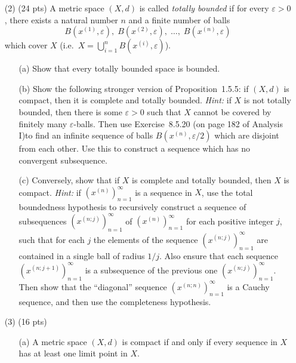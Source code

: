 \documentclass[12pt]{amsart}
\theoremstyle{definition}
\theoremstyle{remark}
\begin{document}
\begin{CJK}{UTF8}{bkai}
\begin{enumerate}
\begin{enumerate}
 
  \end{enumerate}






\bigskip


\item[(2)]  (24 pts) 
A metric space $(X,d)$ is called \emph{totally bounded} if for every $\varepsilon > 0$, there exists a natural number $n$ and a finite number of balls
\[
B(x^{(1)},\varepsilon), \; B(x^{(2)},\varepsilon), \; \dots, \; B(x^{(n)},\varepsilon)
\]
which cover $X$ (i.e.\ $X = \bigcup_{i=1}^n B(x^{(i)},\varepsilon)$).

\begin{enumerate}
\item[(a)] Show that every totally bounded space is bounded.

\item[(b)] Show the following stronger version of Proposition~1.5.5: if $(X,d)$ is compact, then it is complete and totally bounded.  
\emph{Hint:} if $X$ is not totally bounded, then there is some $\varepsilon > 0$ such that $X$ cannot be covered by finitely many $\varepsilon$-balls.  
Then use Exercise~8.5.20  (on page 182 of Analysis I)to find an infinite sequence of balls $B(x^{(n)},\varepsilon/2)$ which are disjoint from each other. Use this to construct a sequence which has no convergent subsequence.

\item[(c)] Conversely, show that if $X$ is complete and totally bounded, then $X$ is compact.  
\emph{Hint:} if $(x^{(n)})_{n=1}^\infty$ is a sequence in $X$, use the total boundedness hypothesis to recursively construct a sequence of subsequences $(x^{(n;j)})_{n=1}^\infty$ of $(x^{(n)})_{n=1}^\infty$ for each positive integer $j$, such that for each $j$ the elements of the sequence $(x^{(n;j)})_{n=1}^\infty$ are contained in a single ball of radius $1/j$.  
Also ensure that each sequence $(x^{(n;j+1)})_{n=1}^\infty$ is a subsequence of the previous one $(x^{(n;j)})_{n=1}^\infty$.  
Then show that the ``diagonal'' sequence $(x^{(n;n)})_{n=1}^\infty$ is a Cauchy sequence, and then use the completeness hypothesis.
\end{enumerate}

\vfill
\bigskip

\item[(3)]  (16 pts) 	

 \begin{enumerate}
  \item[(a)]  A metric space $(X,d)$ is compact if and only if every sequence in $X$ has at least one limit point in $X$.


\end{enumerate}
\end{enumerate}
\end{CJK}
\end{document}
